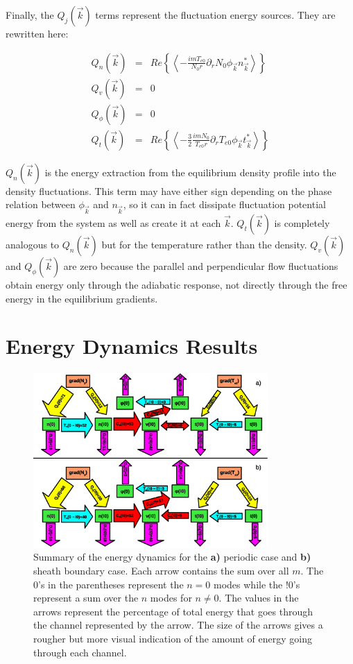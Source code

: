 \documentclass[showpacs,preprintnumbers,amsmath,amssymb,superscriptaddress,aip]{revtex4-1}
\def\beqar{\begin{eqnarray}}
\def\eeqar{\end{eqnarray}}
\newcommand{\pdr}{\partial_r}
\begin{document}
Finally, the $Q_j(\vec{k})$ terms represent the fluctuation energy sources. They are rewritten here:

\beqar
Q_n(\vec{k}) & = & Re \left\{ \left< -\frac{i m T_{e0}}{N_0 r} \pdr N_0 \phi_{\vec{k}} n_{\vec{k}}^*  \right> \right\}
\label{Qnk} \\
Q_v(\vec{k}) & = & 0
\label{Qvk} \\
Q_\phi(\vec{k}) & = & 0
\label{Qpk} \\
Q_t(\vec{k}) & = & Re \left\{ \left< -\frac{3}{2} \frac{i m N_0}{T_{e0} r} \pdr T_{e0} \phi_{\vec{k}} t_{\vec{k}}^*  \right> \right\}
\label{Qtk}
\eeqar

$Q_n(\vec{k})$ is the energy extraction from the equilibrium density profile into the density fluctuations. 
This term may have either sign depending on the phase relation between $\phi_{\vec{k}}$ and $n_{\vec{k}}$, 
so it can in fact dissipate fluctuation potential energy from the system as well as create it
at each $\vec{k}$. $Q_t(\vec{k})$ is completely analogous to $Q_n(\vec{k})$ but for the temperature rather than the density. 
$Q_v(\vec{k})$ and $Q_\phi(\vec{k})$ are zero because the parallel and perpendicular flow fluctuations obtain energy only through the adiabatic response, not directly through the free
energy in the equilibrium gradients.


\section{Energy Dynamics Results}
\label{dyn_results}

\begin{figure}[!htbp]
\includegraphics[width=0.8\textwidth]{energy_diagrams}
\hfil
\caption{Summary of the energy dynamics for the \textbf{a)} periodic case and \textbf{b)} sheath boundary case. Each arrow contains the sum over all $m$. The 0's in the parentheses
represent the $n=0$ modes while the !0's represent a sum over the $n$ modes for $n \ne 0$. The values in the arrows represent the percentage of total energy that goes through the channel
represented by the arrow. The size of the arrows gives a rougher but more visual indication of the amount of energy going through each channel.}
\label{en_diagrams}
\end{figure}
\end{document}
